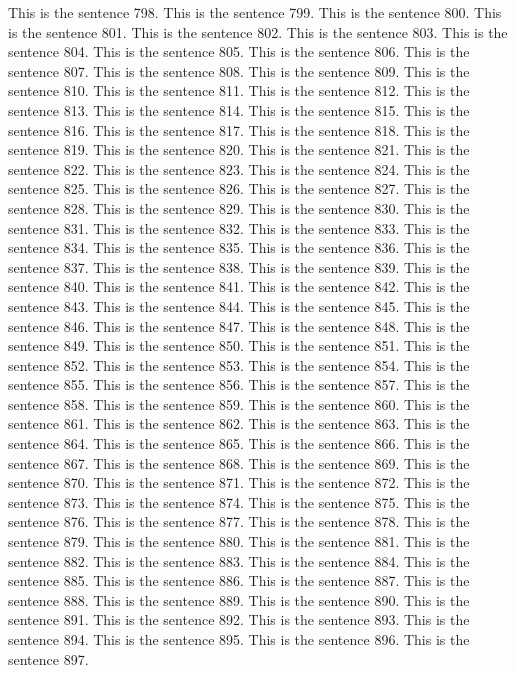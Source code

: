 \documentclass{article}
\begin{document}
This is the sentence 798.
This is the sentence 799.
This is the sentence 800.
This is the sentence 801.
This is the sentence 802.
This is the sentence 803.
This is the sentence 804.
This is the sentence 805.
This is the sentence 806.
This is the sentence 807.
This is the sentence 808.
This is the sentence 809.
This is the sentence 810.
This is the sentence 811.
This is the sentence 812.
This is the sentence 813.
This is the sentence 814.
This is the sentence 815.
This is the sentence 816.
This is the sentence 817.
This is the sentence 818.
This is the sentence 819.
This is the sentence 820.
This is the sentence 821.
This is the sentence 822.
This is the sentence 823.
This is the sentence 824.
This is the sentence 825.
This is the sentence 826.
This is the sentence 827.
This is the sentence 828.
This is the sentence 829.
This is the sentence 830.
This is the sentence 831.
This is the sentence 832.
This is the sentence 833.
This is the sentence 834.
This is the sentence 835.
This is the sentence 836.
This is the sentence 837.
This is the sentence 838.
This is the sentence 839.
This is the sentence 840.
This is the sentence 841.
This is the sentence 842.
This is the sentence 843.
This is the sentence 844.
This is the sentence 845.
This is the sentence 846.
This is the sentence 847.
This is the sentence 848.
This is the sentence 849.
This is the sentence 850.
This is the sentence 851.
This is the sentence 852.
This is the sentence 853.
This is the sentence 854.
This is the sentence 855.
This is the sentence 856.
This is the sentence 857.
This is the sentence 858.
This is the sentence 859.
This is the sentence 860.
This is the sentence 861.
This is the sentence 862.
This is the sentence 863.
This is the sentence 864.
This is the sentence 865.
This is the sentence 866.
This is the sentence 867.
This is the sentence 868.
This is the sentence 869.
This is the sentence 870.
This is the sentence 871.
This is the sentence 872.
This is the sentence 873.
This is the sentence 874.
This is the sentence 875.
This is the sentence 876.
This is the sentence 877.
This is the sentence 878.
This is the sentence 879.
This is the sentence 880.
This is the sentence 881.
This is the sentence 882.
This is the sentence 883.
This is the sentence 884.
This is the sentence 885.
This is the sentence 886.
This is the sentence 887.
This is the sentence 888.
This is the sentence 889.
This is the sentence 890.
This is the sentence 891.
This is the sentence 892.
This is the sentence 893.
This is the sentence 894.
This is the sentence 895.
This is the sentence 896.
This is the sentence 897.
\end{document}
